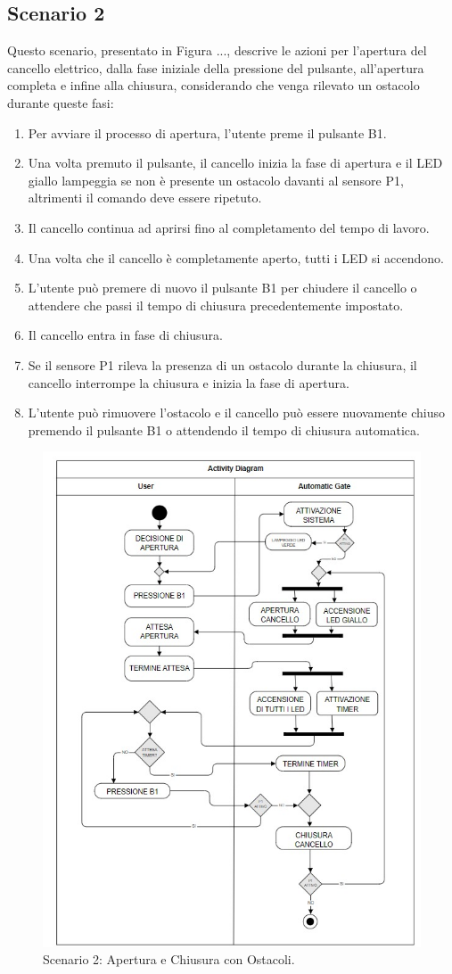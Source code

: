 \documentclass[12pt]{article}
\begin{document}
\subsection{Scenario 2}
Questo scenario, presentato in Figura ..., descrive le azioni per l’apertura del cancello elettrico, dalla fase iniziale della pressione del pulsante, all’apertura completa e infine alla chiusura, considerando che venga rilevato un ostacolo durante queste fasi:
\begin{enumerate}
    \item Per avviare il processo di apertura, l’utente preme il pulsante B1.
    \item Una volta premuto il pulsante, il cancello inizia la fase di apertura e il LED giallo lampeggia se non è presente un ostacolo davanti al sensore P1, altrimenti il comando deve essere ripetuto.
    \item Il cancello continua ad aprirsi fino al completamento del tempo di lavoro.
    \item Una volta che il cancello è completamente aperto, tutti i LED si accendono.
    \item L'utente può premere di nuovo il pulsante B1 per chiudere il cancello o attendere che passi il tempo di chiusura precedentemente impostato.
    \item Il cancello entra in fase di chiusura.
    \item Se il sensore P1 rileva la presenza di un ostacolo durante la chiusura, il cancello interrompe la chiusura e inizia la fase di apertura.
    \item L’utente può rimuovere l’ostacolo e il cancello può essere nuovamente chiuso premendo il pulsante B1 o attendendo il tempo di chiusura automatica.
\end{enumerate}

\begin{figure}[h]
    \centering
    \includegraphics[width = 0.7 \textwidth ]{Scenario_2.jpg}
    \caption{Scenario 2: Apertura e Chiusura con Ostacoli.}
    
\end{figure}
\end{document}
